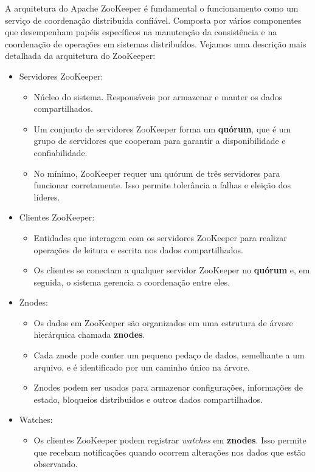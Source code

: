 \documentclass[a4paper,11pt]{article}
\begin{document}
A arquitetura do Apache ZooKeeper é fundamental o funcionamento como um serviço de coordenação distribuída confiável. Composta por vários componentes que desempenham papéis específicos na manutenção da consistência e na coordenação de operações em sistemas distribuídos. Vejamos uma descrição mais detalhada da arquitetura do ZooKeeper: \vspace{-1em}
\begin{itemize}
	\item Servidores ZooKeeper:
	\begin{itemize}
		\item Núcleo do sistema. Responsáveis por armazenar e manter os dados compartilhados.
		\item Um conjunto de servidores ZooKeeper forma um \textbf{quórum}, que é um grupo de servidores que cooperam para garantir a disponibilidade e confiabilidade.
		\item No mínimo, ZooKeeper requer um quórum de três servidores para funcionar corretamente. Isso permite tolerância a falhas e eleição dos líderes.
	\end{itemize}
    \item Clientes ZooKeeper:
	\begin{itemize}
		\item Entidades que interagem com os servidores ZooKeeper para realizar operações de leitura e escrita nos dados compartilhados.
        \item Os clientes se conectam a qualquer servidor ZooKeeper no \textbf{quórum} e, em seguida, o sistema gerencia a coordenação entre eles.
	\end{itemize}
    \item Znodes:
	\begin{itemize}
		\item Os dados em ZooKeeper são organizados em uma estrutura de árvore hierárquica chamada \textbf{znodes}.
        \item Cada znode pode conter um pequeno pedaço de dados, semelhante a um arquivo, e é identificado por um caminho único na árvore.
        \item Znodes podem ser usados para armazenar configurações, informações de estado, bloqueios distribuídos e outros dados compartilhados.
	\end{itemize}
    \item Watches:
	\begin{itemize}
		\item Os clientes ZooKeeper podem registrar \textit{watches} em \textbf{znodes}. Isso permite que recebam notificações quando ocorrem alterações nos dados que estão observando.

\end{itemize}
\end{itemize}
\end{document}
